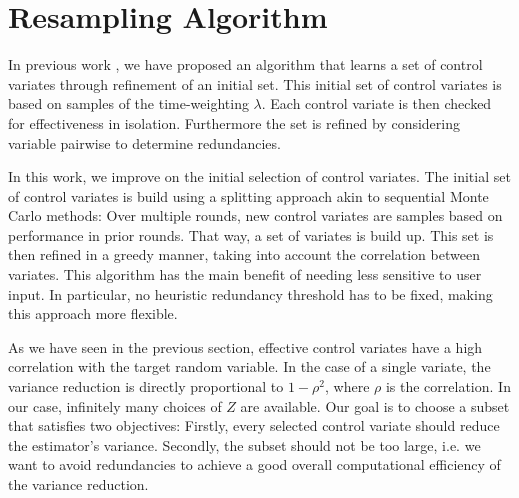 \section{Resampling Algorithm}\label{sec:splitting}
In previous work \parencite{backenkohler2019control}, we have proposed an algorithm that learns a set of
control variates through refinement of an initial set.
This initial set of control variates is based on samples of the time-weighting $\lambda$.
Each control variate is then checked for effectiveness in isolation.
Furthermore the set is refined by considering variable pairwise to determine redundancies.

In this work, we improve on the initial selection of control variates.
The initial set of control variates is build using a splitting approach akin to sequential Monte Carlo methods:
Over multiple rounds, new control variates are samples based on performance in prior rounds.
That way, a set of variates is build up.
This set is then refined in a greedy manner, taking into account the correlation between variates.
This algorithm has the main benefit of needing less sensitive to user input.
In particular, no heuristic redundancy threshold has to be fixed, making this approach more flexible.

As we have seen in the previous section, effective control variates have a high correlation
with the target random variable.
In the case of a single variate, the variance reduction is directly proportional to $1-\rho^2$, where
$\rho$ is the correlation.
In our case, infinitely many choices of $Z$ are available.
Our goal is to choose a subset that
satisfies two objectives:
Firstly, every selected control variate should reduce the estimator's variance.
Secondly, the subset should not be too large, i.e.  we want to avoid redundancies to achieve 
 a good  overall computational efficiency of the variance reduction.


